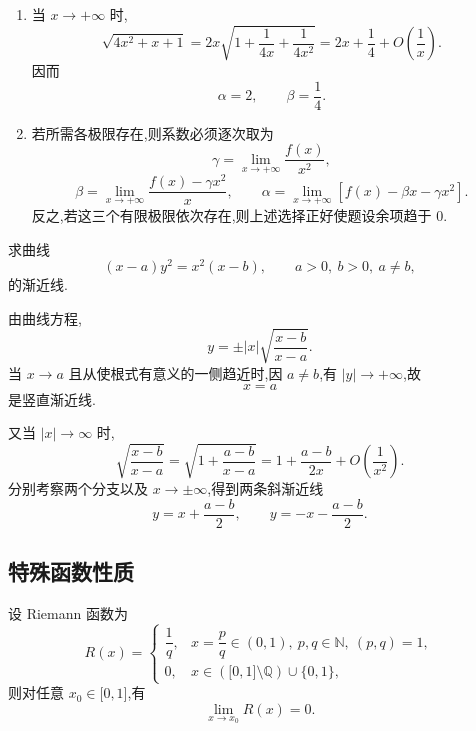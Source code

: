 \begin{solution}
    \leavevmode
    \begin{enumerate}
        \item 当 $x\to+\infty$ 时,
              \[
                  \sqrt{4x^2+x+1}
                  =2x\sqrt{1+\dfrac{1}{4x}+\dfrac{1}{4x^2}}
                  =2x+\dfrac{1}{4}+O\left(\dfrac{1}{x}\right).
              \]
              因而
              \[
                  \alpha=2,
                  \qquad
                  \beta=\dfrac{1}{4}.
              \]
        \item 若所需各极限存在,则系数必须逐次取为
              \[
                  \gamma=\lim\limits_{x\to+\infty}\dfrac{f(x)}{x^2},
              \]
              \[
                  \beta=\lim\limits_{x\to+\infty}
                  \dfrac{f(x)-\gamma x^2}{x},
                  \qquad
                  \alpha=\lim\limits_{x\to+\infty}
                  \left[f(x)-\beta x-\gamma x^2\right].
              \]
              反之,若这三个有限极限依次存在,则上述选择正好使题设余项趋于 $0$.
    \end{enumerate}
\end{solution}

\begin{example}
    求曲线
    \[
        (x-a)y^2=x^2(x-b),
        \qquad a>0,\ b>0,\ a\neq b,
    \]
    的渐近线.
\end{example}
\exampleblank

\begin{solution}
    由曲线方程,
    \[
        y=\pm |x|\sqrt{\dfrac{x-b}{x-a}}.
    \]
    当 $x\to a$ 且从使根式有意义的一侧趋近时,因 $a\neq b$,有 $|y|\to+\infty$,故
    \[
        x=a
    \]
    是竖直渐近线.

    又当 $|x|\to\infty$ 时,
    \[
        \sqrt{\dfrac{x-b}{x-a}}
        =\sqrt{1+\dfrac{a-b}{x-a}}
        =1+\dfrac{a-b}{2x}+O\left(\dfrac{1}{x^2}\right).
    \]
    分别考察两个分支以及 $x\to\pm\infty$,得到两条斜渐近线
    \[
        y=x+\dfrac{a-b}{2},
        \qquad
        y=-x-\dfrac{a-b}{2}.
    \]
\end{solution}



\subsection{特殊函数性质}

\begin{proposition}
    设 Riemann 函数为
    \[
        R(x)=
        \begin{cases}
            \dfrac{1}{q}, & x=\dfrac{p}{q}\in(0,1),\ p,q\in\mathbb{N},\ (p,q)=1, \\
            0,            & x\in\left(\lbrack0,1\rbrack\setminus\mathbb{Q}\right)\cup\{0,1\},
        \end{cases}
    \]
    则对任意 $x_0\in\lbrack 0,1\rbrack$,有
    \[
        \displaystyle\lim\limits_{x\to x_0}R(x)=0.
    \]
\end{proposition}

